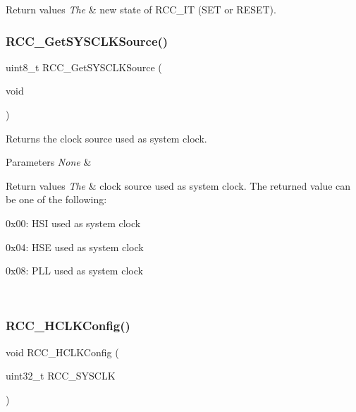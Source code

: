\begin{DoxyRetVals}{Return values}
{\em The} & new state of R\+C\+C\+\_\+\+IT (S\+ET or R\+E\+S\+ET). \\
\hline
\end{DoxyRetVals}
\mbox{\label{group___r_c_c___exported___functions_gaaeb32311c208b2a980841c9c884a41ea}} 
\subsubsection{\texorpdfstring{RCC\_GetSYSCLKSource()}{RCC\_GetSYSCLKSource()}}
{\footnotesize\ttfamily uint8\+\_\+t R\+C\+C\+\_\+\+Get\+S\+Y\+S\+C\+L\+K\+Source (\begin{DoxyParamCaption}\item[{void}]{ }\end{DoxyParamCaption})}



Returns the clock source used as system clock. 


\begin{DoxyParams}{Parameters}
{\em None} & \\
\hline
\end{DoxyParams}

\begin{DoxyRetVals}{Return values}
{\em The} & clock source used as system clock. The returned value can be one of the following\+:
\begin{DoxyItemize}
\item 0x00\+: H\+SI used as system clock
\item 0x04\+: H\+SE used as system clock
\item 0x08\+: P\+LL used as system clock 
\end{DoxyItemize}\\
\hline
\end{DoxyRetVals}
\mbox{\label{group___r_c_c___exported___functions_ga9d0aec72e236c6cdf3a3a82dfb525491}} 
\subsubsection{\texorpdfstring{RCC\_HCLKConfig()}{RCC\_HCLKConfig()}}
{\footnotesize\ttfamily void R\+C\+C\+\_\+\+H\+C\+L\+K\+Config (\begin{DoxyParamCaption}\item[{uint32\+\_\+t}]{R\+C\+C\+\_\+\+S\+Y\+S\+C\+LK }\end{DoxyParamCaption})}



